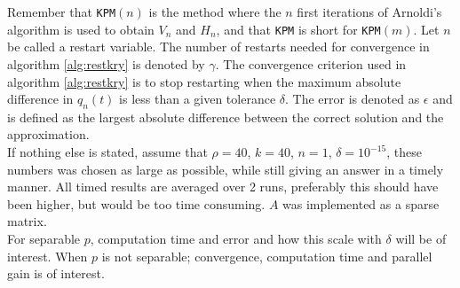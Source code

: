 Remember that \texttt{KPM}$(n)$ is the method where the $n$ first iterations of Arnoldi's algorithm is used to obtain $V_n$ and $H_n$, and that \texttt{KPM} is short for \texttt{KPM}$(m)$. Let $n$ be called a restart variable. The number of restarts needed for convergence in algorithm \ref{alg:restkry} is denoted by $\gamma$. The convergence criterion used in algorithm \ref{alg:restkry} is to stop restarting when the maximum absolute difference in $q_n(t)$ is less than a given tolerance $\delta$. The error is denoted as $\epsilon$ and is defined as the largest absolute difference between the correct solution and the approximation. \\

If nothing else is stated, assume that $\rho =40$, $k = 40$, $n = 1$, $\delta = 10^{-15}$, these numbers was chosen as large as possible, while still giving an answer in a timely manner. All timed results are averaged over 2 runs, preferably this should have been higher, but would be too time consuming. $A$ was implemented as a sparse matrix.\\
 
For separable $p$, computation time and error and how this scale with $\delta$ will be of interest. When $p$ is not separable; convergence, computation time and parallel gain is of interest. \\



